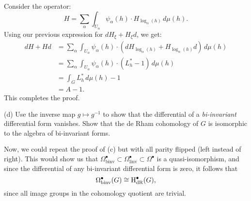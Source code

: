\documentclass{../../templates/lkx_pset}
\begin{document}
\begin{parts}
	Consider the operator:
	\[
    H = \sum_{\alpha} \int_{U_\alpha} \psi_\alpha(h)\cdot H_{\log_\alpha(h)} \,d\mu(h).
	\]
	Using our previous expression for $dH_\xi + H_\xi d$, we get:
	\[
    \begin{aligned}
      dH + Hd 
      &= \sum_\alpha \int_{U_\alpha} \psi_\alpha(h) \cdot (dH_{\log_\alpha(h)} + H_{\log_\alpha(h)}d)\,d\mu(h)\\
      &= \sum_\alpha \int_{U_\alpha} \psi_\alpha(h) \cdot (L^*_h - 1)\,d\mu(h)\\
      &= \int_G L^*_h\,d\mu(h) - 1\\
      &= A - 1.
    \end{aligned}
	\]
	This completes the proof.

	\begin{part}{(d)}
		Use the inverse map $g \mapsto g^{-1}$ to show that the differential of a \emph{bi-invariant} differential form vanishes. Show that the de Rham cohomology of $G$ is isomorphic to the algebra of bi-invariant forms.
	\end{part}


	Now, we could repeat the proof of (c) but with all parity flipped (left instead of right). This would show us that $\Omega^\bullet_{\textrm{binv}} \subset \Omega^\bullet_{\textrm{linv}} \subset \Omega^\bullet$ is a quasi-isomorphism, and since the differential of any bi-invariant differential form is zero, it follows that
	\[
		\Omega^\bullet_{\textrm{binv}}(G) \cong \operatorname{H}_{\operatorname{dR}}^\bullet(G),
	\]
	since all image groups in the cohomology quotient are trivial.


\end{parts}
\end{document}
